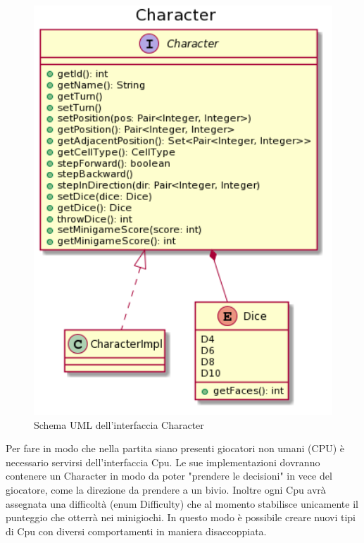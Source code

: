 \documentclass[a4paper,12pt]{report}
\begin{document}
    \begin{figure}[!t]
        \centering{}
        \includegraphics[width=150mm]{images/picchiotti/character.png}
        \caption{Schema UML dell'interfaccia Character}
        \label{img:character}
    \end{figure}
	Per fare in modo che nella partita siano presenti giocatori non umani (CPU) è necessario servirsi
	dell'interfaccia Cpu.\newline
	Le sue implementazioni dovranno contenere un Character in modo da poter "prendere le decisioni" in vece del giocatore, come la direzione da prendere a un bivio.\newline
	Inoltre ogni Cpu avrà assegnata una difficoltà (enum Difficulty) che al momento stabilisce unicamente il punteggio che otterrà nei minigiochi.\newline
	In questo modo è possibile creare nuovi tipi di Cpu con diversi comportamenti in maniera disaccoppiata.
\end{document}
